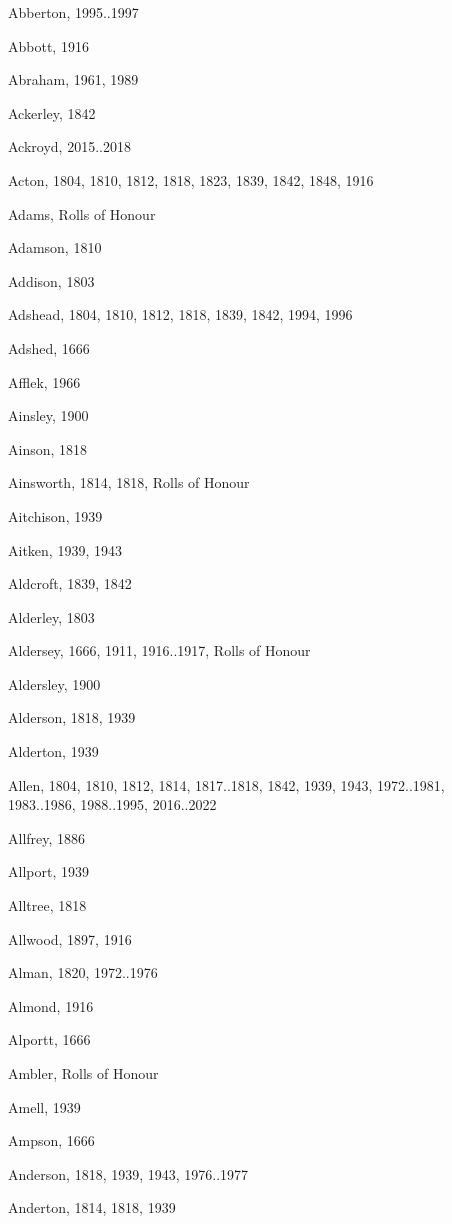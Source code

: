 \renewcommand*{\indexname}{Index of Surnames}
\begin{theindex}
\item Abberton, 1995..1997
\item Abbott, 1916
\item Abraham, 1961, 1989
\item Ackerley, 1842
\item Ackroyd, 2015..2018
\item Acton, 1804, 1810, 1812, 1818, 1823, 1839, 1842, 1848, 1916
\item Adams, Rolls of Honour
\item Adamson, 1810
\item Addison, 1803
\item Adshead, 1804, 1810, 1812, 1818, 1839, 1842, 1994, 1996
\item Adshed, 1666
\item Afflek, 1966
\item Ainsley, 1900
\item Ainson, 1818
\item Ainsworth, 1814, 1818, Rolls of Honour
\item Aitchison, 1939
\item Aitken, 1939, 1943
\item Aldcroft, 1839, 1842
\item Alderley, 1803
\item Aldersey, 1666, 1911, 1916..1917, Rolls of Honour
\item Aldersley, 1900
\item Alderson, 1818, 1939
\item Alderton, 1939
\item Allen, 1804, 1810, 1812, 1814, 1817..1818, 1842, 1939, 1943, 1972..1981, 1983..1986, 1988..1995, 2016..2022
\item Allfrey, 1886
\item Allport, 1939
\item Alltree, 1818
\item Allwood, 1897, 1916
\item Alman, 1820, 1972..1976
\item Almond, 1916
\item Alportt, 1666
\item Ambler, Rolls of Honour
\item Amell, 1939
\item Ampson, 1666
\item Anderson, 1818, 1939, 1943, 1976..1977
\item Anderton, 1814, 1818, 1939

\end{theindex}
